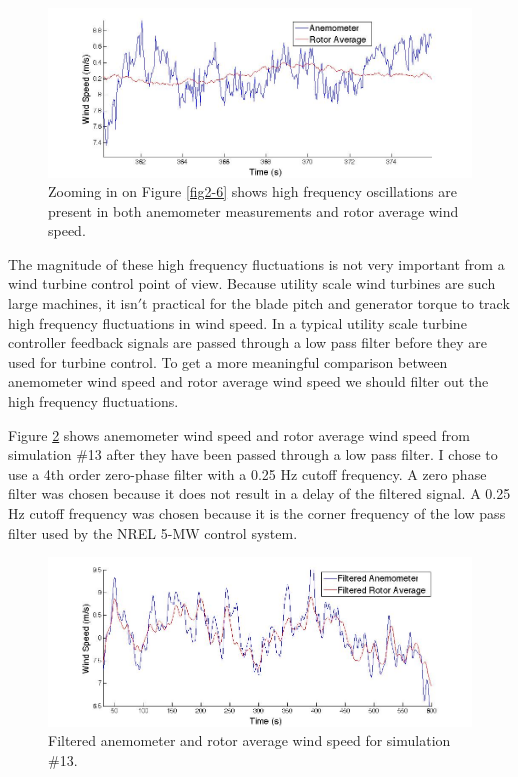 \begin{figure}[htbp]
	\centering
		\includegraphics[width = \linewidth]{Figures/ch2Figures/fig2-7.jpg}
	\caption{Zooming in on Figure \ref{fig2-6} shows high frequency oscillations are present in both anemometer measurements and rotor average wind speed.}
	\label{fig2-7}
\end{figure}

The magnitude of these high frequency fluctuations is not very important from a wind turbine control point of view. Because utility scale wind turbines are such large machines, it isn$'$t practical for the blade pitch and generator torque to track high frequency fluctuations in wind speed. In a typical utility scale turbine controller feedback signals are passed through a low pass filter before they are used for turbine control. To get a more meaningful comparison between anemometer wind speed and rotor average wind speed we should filter out the high frequency fluctuations.

Figure \ref{fig2-8} shows anemometer wind speed and rotor average wind speed from simulation \#13 after they have been passed through a low pass filter. I chose to use a 4th order zero-phase filter with a 0.25 Hz cutoff frequency. A zero phase filter was chosen because it does not result in a delay of the filtered signal. A 0.25 Hz cutoff frequency was chosen because it is the corner frequency of the low pass filter used by the NREL 5-MW control system. 

\begin{figure}[htbp]
	\centering
		\includegraphics[width = \linewidth]{Figures/ch2Figures/fig2-8.jpg}
		
	\caption{Filtered anemometer and rotor average wind speed for simulation \#13.}
	\label{fig2-8}
\end{figure}

